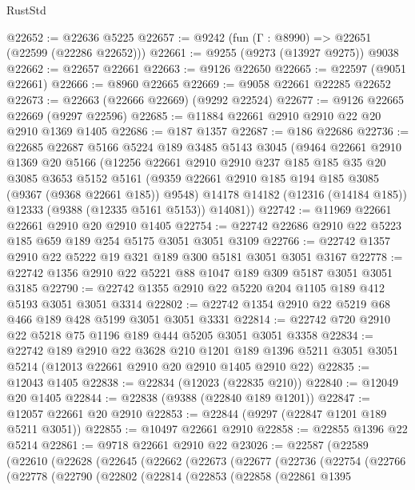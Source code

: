 \begin{lexlean}{RustStd}
\begin{coremodule}
@22652 := @22636 @5225
@22657 := @9242 (fun (Γ : @8990) => @22651 (@22599 (@22286 @22652)))
@22661 := @9255 (@9273 (@13927 @9275)) @9038
@22662 := @22657 @22661
@22663 := @9126 @22650
@22665 := @22597 (@9051 @22661)
@22666 := @8960 @22665
@22669 := @9058 @22661 @22285 @22652
@22673 := @22663 (@22666 @22669) (@9292 @22524)
@22677 := @9126 @22665 @22669 (@9297 @22596)
@22685 := @11884 @22661 @2910 @2910 @22 @20 @2910 @1369 @1405
@22686 := @187 @1357
@22687 := @186 @22686
@22736 := @22685
    @22687
    @5166
    @5224
    @189
    @3485
    @5143
    @3045
    (@9464
      @22661
      @2910
      @1369
      @20
      @5166
      (@12256
        @22661
        @2910
        @2910
        @237
        @185
        @185
        @35
        @20
        @3085
        @3653
        @5152
        @5161
        (@9359 @22661 @2910 @185 @194 @185 @3085 (@9367 (@9368 @22661 @185)) @9548)
        @14178
        @14182
        (@12316 (@14184 @185))
        @12333
        (@9388 (@12335 @5161 @5153))
        @14081))
@22742 := @11969 @22661 @22661 @2910 @20 @2910 @1405
@22754 := @22742 @22686 @2910 @22 @5223 @185 @659 @189 @254 @5175 @3051 @3051 @3109
@22766 := @22742 @1357 @2910 @22 @5222 @19 @321 @189 @300 @5181 @3051 @3051 @3167
@22778 := @22742 @1356 @2910 @22 @5221 @88 @1047 @189 @309 @5187 @3051 @3051 @3185
@22790 := @22742 @1355 @2910 @22 @5220 @204 @1105 @189 @412 @5193 @3051 @3051 @3314
@22802 := @22742 @1354 @2910 @22 @5219 @68 @466 @189 @428 @5199 @3051 @3051 @3331
@22814 := @22742 @720 @2910 @22 @5218 @75 @1196 @189 @444 @5205 @3051 @3051 @3358
@22834 := @22742
    @189
    @2910
    @22
    @3628
    @210
    @1201
    @189
    @1396
    @5211
    @3051
    @3051
    @5214
    (@12013 @22661 @2910 @20 @2910 @1405 @2910 @22)
@22835 := @12043 @1405
@22838 := @22834 (@12023 (@22835 @210))
@22840 := @12049 @20 @1405
@22844 := @22838 (@9388 (@22840 @189 @1201))
@22847 := @12057 @22661 @20 @2910
@22853 := @22844 (@9297 (@22847 @1201 @189 @5211 @3051))
@22855 := @10497 @22661 @2910
@22858 := @22855 @1396 @22 @5214
@22861 := @9718 @22661 @2910 @22
@23026 := @22587
    (@22589
      (@22610
        (@22628
          (@22645
            (@22662
              (@22673
                (@22677
                  (@22736
                    (@22754
                      (@22766
                        (@22778
                          (@22790
                            (@22802
                              (@22814
                                (@22853
                                  (@22858
                                    (@22861
                                      @1395

\end{coremodule}
\end{lexlean}
